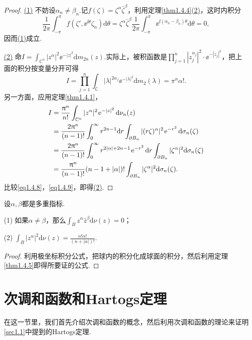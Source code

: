 \begin{proof}
	\hyperlink{1.4.5}{(1)}
	不妨设$\alpha_n\neq\beta_n$.记$f(\zeta)=\zeta^\alpha \bar{\zeta}^\beta$，利用定理\ref{thm1.4.4}\hyperlink{1.4.4}{(2)}，这时内积分
	\[\frac1{2\pi} \int_{-\pi}^{\pi} f(\zeta',\ee^{\ii\theta}\zeta_n)\mathrm{d}\theta=\zeta^\alpha\bar{\zeta}^\beta \frac1{2\pi}\int_{-\pi}^{\pi} \ee^{\ii(\alpha_n-\beta_n)\theta}\mathrm{d}\theta=0,\]
	因而\hyperlink{1.4.5}{(1)}成立.
	
	\hyperlink{1.4.5}{(2)}
	命$I=\int_{\mathbb{C}^n} |z^\alpha|^2 \ee^{-|z|^2}\mathrm{d}m_{2n}(z).$实际上，被积函数是$\prod\limits_{j=1}^{n} |z_j^{\alpha_j}|^2\cdot \ee^{-|z_j|^2}$，把上面的积分按变量分开可得
	\begin{equation}\label{eq1.4.8}
		I=\prod_{j=1}^{n} \int_{\mathbb{C}}|\lambda|^{2\alpha_j} \ee^{-|\lambda|^2} \mathrm{d}m_2(\lambda)=\pi^n \alpha!.
	\end{equation}
另一方面，应用定理\ref{thm1.4.1}，
\begin{align}\label{eq1.4.9}
	I
	&=\frac{\uppi^n}{n!}\int_{\mathbb{C}^n}|z^\alpha|^2\operatorname{\!\!\;\mathrm e}^{-|z|^2}\mathrm{d}\nu_n(z)\notag\\
	&=\frac{2\uppi^n}{(n-1)!}\int_{0}^{\infty} r^{2n-1}\mathrm{d}r \int_{\partial B_n} |(r\zeta)^\alpha|^2 \operatorname{\!\!\;\mathrm e}^{-r^2} \mathrm{d}\sigma_n(\zeta)\notag\\
	&=\frac{2\uppi^n}{(n-1)!}\int_{0}^{\infty} r^{2|\alpha|+2n-1}\operatorname{\!\!\;\mathrm e}^{-r^2}\mathrm{d}r\int_{\partial B_n} |\zeta^\alpha|^2\mathrm{d}\sigma_n(\zeta)\notag\\
	&=\frac{\uppi^n}{(n-1)!}(n-1+|\alpha|)!\int_{\partial B_n} |\zeta^\alpha|^2 \mathrm{d}\sigma_n(\zeta).
\end{align}
比较\eqref{eq1.4.8}，\eqref{eq1.4.9}，即得\hyperlink{1.4.5}{(2)}.
\end{proof}
\begin{theorem}\label{thm1.4.6}
	设$\alpha,\beta$都是多重指标.

		(1) \hypertarget{1.4.6}{}
		如果$\alpha\neq\beta$，那么$\int_B z^\alpha\bar{z}^\beta\mathrm{d}\nu(z)=0$；
		
		(2) \hypertarget{1.4.6}{}
		$\int_B|z^\alpha|^2 \mathrm{d}\nu(z)=\frac{n!\alpha!}{(n+|\alpha|)!}$.

\end{theorem}
\begin{proof}
	利用极坐标积分公式，把球内的积分化成球面的积分，然后利用定理\ref{thm1.4.5}即得所要证的公式.
\end{proof}
\section{次调和函数和Hartogs定理\label{sec1.5}}
在这一节里，我们首先介绍次调和函数的概念，然后利用次调和函数的理论来证明\ref{sec1.1}中提到的Hartogs定理.
